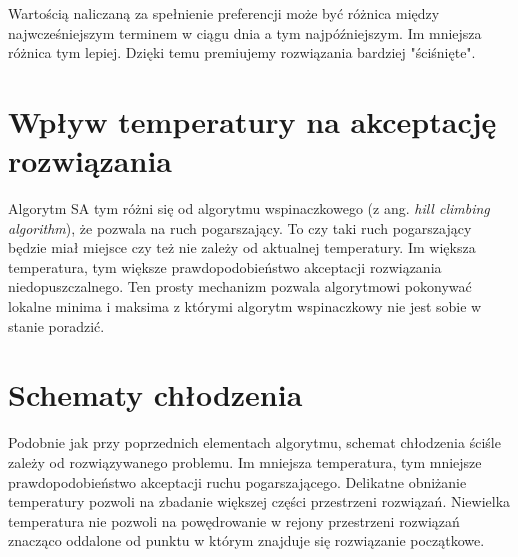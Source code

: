 Wartością naliczaną za spełnienie preferencji może być różnica między
najwcześniejszym terminem w ciągu dnia a tym najpóźniejszym. Im mniejsza różnica
tym lepiej. Dzięki temu premiujemy rozwiązania bardziej "ściśnięte".

\section{Wpływ temperatury na akceptację rozwiązania}
Algorytm SA tym różni się od algorytmu wspinaczkowego (z ang. \emph{hill
climbing algorithm}), że pozwala na ruch pogarszający. To czy taki ruch
pogarszający będzie miał miejsce czy też nie zależy od aktualnej temperatury. Im
większa temperatura, tym większe prawdopodobieństwo akceptacji rozwiązania
niedopuszczalnego. Ten prosty mechanizm pozwala algorytmowi pokonywać lokalne
minima i maksima z którymi algorytm wspinaczkowy nie jest sobie w stanie
poradzić.

\section{Schematy chłodzenia}
Podobnie jak przy poprzednich elementach algorytmu, schemat chłodzenia ściśle
zależy od rozwiązywanego problemu. Im mniejsza temperatura, tym mniejsze
prawdopodobieństwo akceptacji ruchu pogarszającego. Delikatne obniżanie
temperatury pozwoli na zbadanie większej części przestrzeni rozwiązań. Niewielka
temperatura nie pozwoli na powędrowanie w rejony przestrzeni rozwiązań znacząco
oddalone od punktu w którym znajduje się rozwiązanie początkowe.

